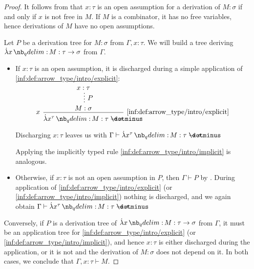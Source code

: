 \begin{proof}
   It follows from  that \( x: \tau \) is an open assumption for a derivation of \( M: \sigma \) if and only if \( x \) is not free in \( M \). If \( M \) is a combinator, it has no free variables, hence derivations of \( M \) have no open assumptions.


  \SufficiencySubProof* Let \( P \) be a derivation tree for \( M: \sigma \) from \( \Gamma, x: \tau \). We will build a tree deriving \( \qabs x M: \tau \to \sigma \) from \( \Gamma \).

  \begin{itemize}
    \item If \( x: \tau \) is an open assumption, it is discharged during a simple application of \ref{inf:def:arrow_type/intro/explicit}:
    \begin{equation*}
      \begin{prooftree}
        \hypo{ x: \tau }
        \ellipsis { \( P \) } { M: \sigma }
        \infer[left label=\( x \)]1[\ref{inf:def:arrow_type/intro/explicit}]{ \qabs {x^\tau} M: \tau \synimplies \sigma }
      \end{prooftree}
    \end{equation*}

    Discharging \( x: \tau \) leaves us with \( \Gamma \vdash \qabs {x^\tau} M: \tau \synimplies \sigma \).

    Applying the implicitly typed rule \ref{inf:def:arrow_type/intro/implicit} is analogous.

    \item Otherwise, if \( x: \tau \) is not an open assumption in \( P \), then \( \Gamma \vdash P \) by . During application of \ref{inf:def:arrow_type/intro/explicit} (or \ref{inf:def:arrow_type/intro/implicit}) nothing is discharged, and we again obtain \( \Gamma \vdash \qabs {x^\tau} M: \tau \synimplies \sigma \).
  \end{itemize}

  \NecessitySubProof* Conversely, if \( P \) is a derivation tree of \( \qabs x M: \tau \to \sigma \) from \( \Gamma \), it must be an application tree for \ref{inf:def:arrow_type/intro/explicit} (or \ref{inf:def:arrow_type/intro/implicit}), and hence \( x: \tau \) is either discharged during the application, or it is not and the derivation of \( M: \sigma \) does not depend on it. In both cases, we conclude that \( \Gamma, x: \tau \vdash M \).
\end{proof}

